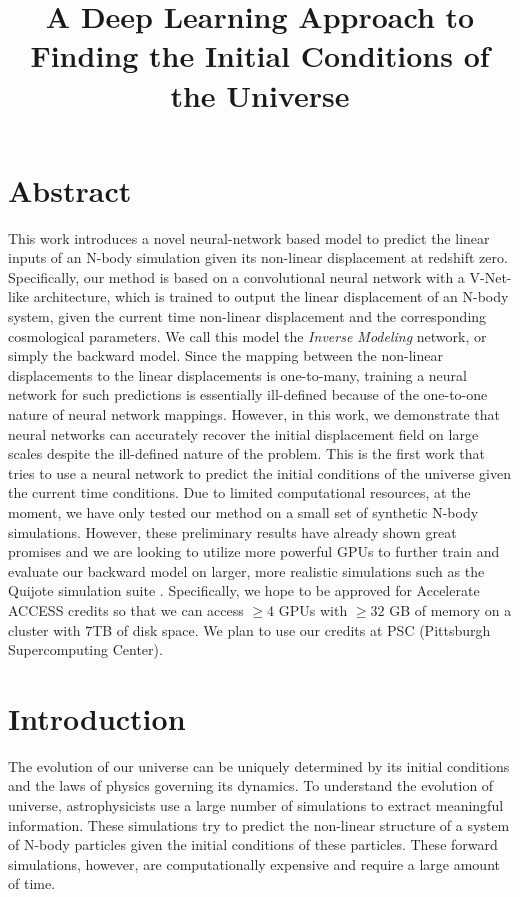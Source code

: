 \documentclass[10pt]{article}
\title{A Deep Learning Approach to Finding the Initial Conditions of the Universe}
\makeatletter
\let\inserttitle\@title
\makeatother
\begin{document}
\begin{center}
  \LARGE{\inserttitle}

\end{center}

\section{Abstract}

This work introduces a novel neural-network based model to predict the linear inputs of an N-body simulation given its non-linear displacement at redshift zero.
Specifically, our method is based on a convolutional neural network with a V-Net-like architecture, which is trained to output the linear displacement of an N-body system, given the current time non-linear displacement and the corresponding cosmological parameters.
We call this model the \textit{Inverse Modeling} network, or simply the backward model.
Since the mapping between the non-linear displacements to the linear displacements is one-to-many, training a neural network for such predictions is essentially ill-defined because of the one-to-one nature of neural network mappings.
However, in this work, we demonstrate that neural networks can accurately recover the initial displacement field on large scales despite the ill-defined nature of the problem.
This is the first work that tries to use a neural network to predict the initial conditions of the universe given the current time conditions.
Due to limited computational resources, at the moment, we have only tested our method on a small set of synthetic N-body simulations. However, these preliminary results have already shown great promises and we are looking to utilize more powerful GPUs to further train and evaluate our backward model on larger, more realistic simulations such as the Quijote simulation suite \cite{quijote}. Specifically, we hope to be approved for Accelerate ACCESS credits so that we can access $\geq 4$ GPUs with $\geq 32$ GB of memory on a cluster with $7$TB of disk space. We plan to use our credits at PSC (Pittsburgh Supercomputing Center).

\section{Introduction}

The evolution of our universe can be uniquely determined by its initial conditions and the laws of physics governing its dynamics. To understand the evolution of  universe, astrophysicists use a large number of simulations to extract meaningful information. These simulations try to predict the non-linear structure of a system of N-body particles given the initial conditions of these particles. These forward simulations, however, are computationally expensive and require a large amount of time.
\end{document}
